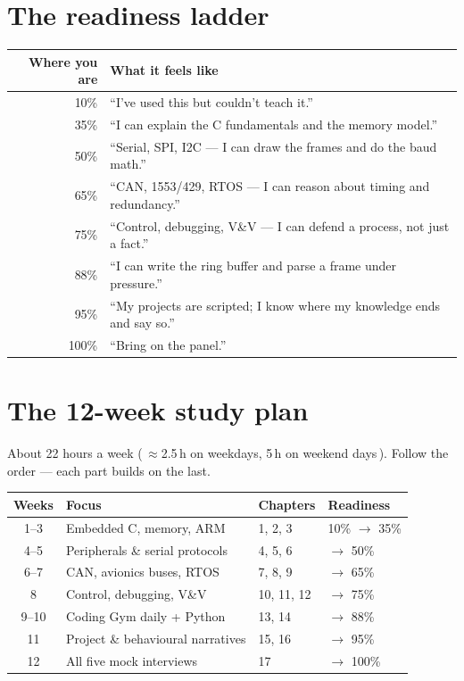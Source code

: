 \section*{The readiness ladder}
\begin{center}
\small
\begin{tabular}{@{}rl@{}}
\toprule
\textbf{Where you are} & \textbf{What it feels like}\\
\midrule
10\% & ``I've used this but couldn't teach it.''\\
35\% & ``I can explain the C fundamentals and the memory model.''\\
50\% & ``Serial, SPI, I2C --- I can draw the frames and do the baud math.''\\
65\% & ``CAN, 1553/429, RTOS --- I can reason about timing and redundancy.''\\
75\% & ``Control, debugging, V\&V --- I can defend a process, not just a fact.''\\
88\% & ``I can write the ring buffer and parse a frame under pressure.''\\
95\% & ``My projects are scripted; I know where my knowledge ends and say so.''\\
100\% & ``Bring on the panel.''\\
\bottomrule
\end{tabular}
\end{center}

\section*{The 12-week study plan}
About 22 hours a week (\,$\approx$2.5\,h on weekdays, 5\,h on weekend days\,).
Follow the order --- each part builds on the last.

\begin{center}
\small
\begin{tabular}{@{}clll@{}}
\toprule
\textbf{Weeks} & \textbf{Focus} & \textbf{Chapters} & \textbf{Readiness}\\
\midrule
1--3  & Embedded C, memory, ARM            & 1, 2, 3      & 10\% $\rightarrow$ 35\%\\
4--5  & Peripherals \& serial protocols    & 4, 5, 6      & $\rightarrow$ 50\%\\
6--7  & CAN, avionics buses, RTOS          & 7, 8, 9      & $\rightarrow$ 65\%\\
8     & Control, debugging, V\&V           & 10, 11, 12   & $\rightarrow$ 75\%\\
9--10 & Coding Gym daily + Python          & 13, 14       & $\rightarrow$ 88\%\\
11    & Project \& behavioural narratives  & 15, 16       & $\rightarrow$ 95\%\\
12    & All five mock interviews           & 17           & $\rightarrow$ 100\%\\
\bottomrule
\end{tabular}
\end{center}

